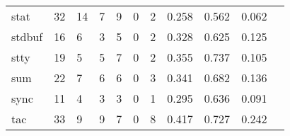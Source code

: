 \begin{longtable}{lp{1.20cm}p{1.20cm}p{1.20cm}p{1.20cm}p{1.20cm}p{1.20cm}p{1.20cm}p{1.20cm}p{1.20cm}p{1.20cm}}
stat      &                                    32 &                                                 14 &                                                  7 &                                                  9 &                                                  0 &                                                  2 &                                         0.258 &                                              0.562 &                                              0.062 \\
stdbuf    &                                    16 &                                                  6 &                                                  3 &                                                  5 &                                                  0 &                                                  2 &                                         0.328 &                                              0.625 &                                              0.125 \\
stty      &                                    19 &                                                  5 &                                                  5 &                                                  7 &                                                  0 &                                                  2 &                                         0.355 &                                              0.737 &                                              0.105 \\
sum       &                                    22 &                                                  7 &                                                  6 &                                                  6 &                                                  0 &                                                  3 &                                         0.341 &                                              0.682 &                                              0.136 \\
sync      &                                    11 &                                                  4 &                                                  3 &                                                  3 &                                                  0 &                                                  1 &                                         0.295 &                                              0.636 &                                              0.091 \\
tac       &                                    33 &                                                  9 &                                                  9 &                                                  7 &                                                  0 &                                                  8 &                                         0.417 &                                              0.727 &                                              0.242 \\

\end{longtable}
